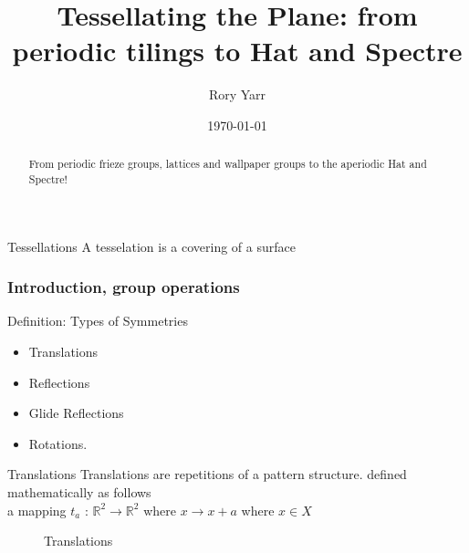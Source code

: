 \documentclass{beamer}
\title[Tilling the Plane]{Tessellating the Plane: from periodic tilings to Hat and Spectre}
\author{Rory Yarr}
\date{\today}
\begin{document}
\begin{frame}
  \titlepage

  \begin{abstract}
    From periodic frieze groups, lattices and wallpaper groups to the aperiodic Hat and Spectre!
  \end{abstract}
\end{frame}

\begin{frame}{Tessellations}
    A tesselation is a covering of a surface
\end{frame}

\begin{frame}
  \frametitle{Introduction, group operations}
  \begin{block}{Definition: Types of Symmetries}
  \begin{itemize}
      \item Translations 
      \item Reflections
      \item Glide Reflections
      \item Rotations.
  \end{itemize}
  \end{block}
\end{frame}

\begin{frame}{Translations }
     Translations are repetitions of a pattern structure.  defined mathematically as follows \\ 
    a mapping $t_a$ : $\mathbb{R}^2 \rightarrow \mathbb{R}^2$ where $x \rightarrow x + a $ where $x \in X$  \cite{Angela:2023}
   \begin{figure}
        \centering
        \caption{Translations}
        \label{Reflection}
    \end{figure}
\end{frame}
\end{document}
